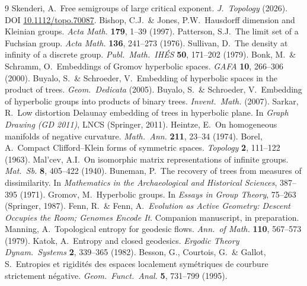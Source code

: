 \documentclass[11pt,reqno]{amsart}
\theoremstyle{plain}
\theoremstyle{definition}
\begin{document}
\begin{thebibliography}{9}\small
{} Skenderi, A.\ Free semigroups of large critical exponent. \emph{J.\ Topology} (2026). DOI \href{https://doi.org/10.1112/topo.70087}{10.1112/topo.70087}.
 Bishop, C.J.\ \& Jones, P.W.\ Hausdorff dimension and Kleinian groups. \emph{Acta Math.} \textbf{179}, 1--39 (1997).
 Patterson, S.J.\ The limit set of a Fuchsian group. \emph{Acta Math.} \textbf{136}, 241--273 (1976).
 Sullivan, D.\ The density at infinity of a discrete group. \emph{Publ.\ Math.\ IH\'ES} \textbf{50}, 171--202 (1979).
 Bonk, M.\ \& Schramm, O.\ Embeddings of Gromov hyperbolic spaces. \emph{GAFA} \textbf{10}, 266--306 (2000).
 Buyalo, S.\ \& Schroeder, V.\ Embedding of hyperbolic spaces in the product of trees. \emph{Geom.\ Dedicata} (2005).
 Buyalo, S.\ \& Schroeder, V.\ Embedding of hyperbolic groups into products of binary trees. \emph{Invent.\ Math.} (2007).
 Sarkar, R.\ Low distortion Delaunay embedding of trees in hyperbolic plane. In \emph{Graph Drawing (GD 2011)}, LNCS (Springer, 2011).
 Heintze, E.\ On homogeneous manifolds of negative curvature. \emph{Math.\ Ann.} \textbf{211}, 23--34 (1974).
 Borel, A.\ Compact Clifford--Klein forms of symmetric spaces. \emph{Topology} \textbf{2}, 111--122 (1963).
 Mal'cev, A.I.\ On isomorphic matrix representations of infinite groups. \emph{Mat.\ Sb.} \textbf{8}, 405--422 (1940).
 Buneman, P.\ The recovery of trees from measures of dissimilarity. In \emph{Mathematics in the Archaeological and Historical Sciences}, 387--395 (1971).
 Gromov, M.\ Hyperbolic groups. In \emph{Essays in Group Theory}, 75--263 (Springer, 1987).
 Fenn, R.\ \& Fenn, A.\ \emph{Evolution as Active Geometry: Descent Occupies the Room; Genomes Encode It}. Companion manuscript, in preparation.
 Manning, A.\ Topological entropy for geodesic flows. \emph{Ann.\ of Math.} \textbf{110}, 567--573 (1979).
 Katok, A.\ Entropy and closed geodesics. \emph{Ergodic Theory Dynam.\ Systems} \textbf{2}, 339--365 (1982).
 Besson, G., Courtois, G.\ \& Gallot, S.\ Entropies et rigidit\'es des espaces localement sym\'etriques de courbure strictement n\'egative. \emph{Geom.\ Funct.\ Anal.} \textbf{5}, 731--799 (1995).
\end{thebibliography}
\end{document}

